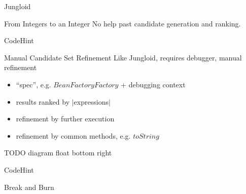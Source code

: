 \documentclass{beamer}
\begin{document}
\begin{frame}{Jungloid}
  \begin{block}{From Integers to an Integer}
    No help past candidate generation and ranking.

    \begin{example}
      
    \end{example}
  \end{block}
\end{frame}

\begin{frame}{CodeHint}
  \begin{block}{Manual Candidate Set Refinement}
    Like Jungloid, requires debugger, manual refinement

    \begin{itemize}
      \item ``spec'', e.g. $BeanFactoryFactory$ + debugging context
      \item results ranked by $|$expressions$|$
      \item refinement by further execution
      \item refinement by common methods, e.g. $toString$
    \end{itemize}

    TODO diagram float bottom right
  \end{block}
\end{frame}

\begin{frame}{CodeHint}
  \begin{block}{Break and Burn}

    \begin{example}
      
    \end{example}
  \end{block}
\end{frame}


\end{document}
